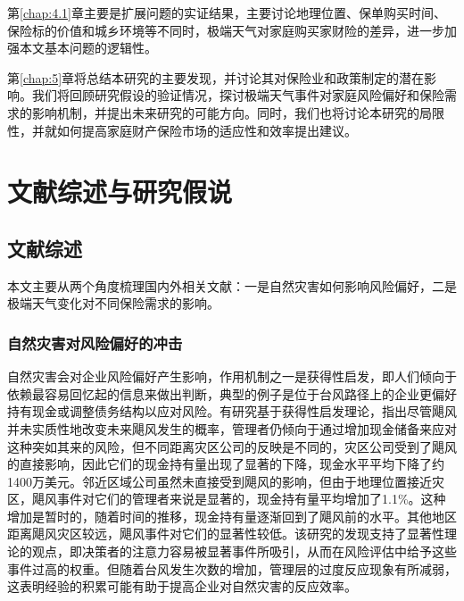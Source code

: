 第\ref{chap:4.1}章主要是扩展问题的实证结果，主要讨论地理位置、保单购买时间、保险标的价值和城乡环境等不同时，极端天气对家庭购买家财险的差异，进一步加强本文基本问题的逻辑性。

第\ref{chap:5}章将总结本研究的主要发现，并讨论其对保险业和政策制定的潜在影响。我们将回顾研究假设的验证情况，探讨极端天气事件对家庭风险偏好和保险需求的影响机制，并提出未来研究的可能方向。同时，我们也将讨论本研究的局限性，并就如何提高家庭财产保险市场的适应性和效率提出建议。

\chapter{文献综述与研究假说}\label{chap:2}
\section{文献综述}

本文主要从两个角度梳理国内外相关文献：一是自然灾害如何影响风险偏好，二是极端天气变化对不同保险需求的影响。

\subsection{自然灾害对风险偏好的冲击}

自然灾害会对企业风险偏好产生影响，作用机制之一是获得性启发\citep{tversky1973availability}，即人们倾向于依赖最容易回忆起的信息来做出判断，典型的例子是位于台风路径上的企业更偏好持有现金\citep{杨娜娜2019自然灾害与企业现金持有}或调整债务结构\citep{shao2024typhoons}以应对风险。有研究基于获得性启发理论\citep{0Do}，指出尽管飓风并未实质性地改变未来飓风发生的概率，管理者仍倾向于通过增加现金储备来应对这种突如其来的风险，但不同距离灾区公司的反映是不同的，灾区公司受到了飓风的直接影响，因此它们的现金持有量出现了显著的下降，现金水平平均下降了约1400万美元。邻近区域公司虽然未直接受到飓风的影响，但由于地理位置接近灾区，飓风事件对它们的管理者来说是显著的，现金持有量平均增加了1.1\%。这种增加是暂时的，随着时间的推移，现金持有量逐渐回到了飓风前的水平。其他地区距离飓风灾区较远，飓风事件对它们的显著性较低。该研究的发现支持了显著性理论的观点，即决策者的注意力容易被显著事件所吸引，从而在风险评估中给予这些事件过高的权重。但随着台风发生次数的增加，管理层的过度反应现象有所减弱，这表明经验的积累可能有助于提高企业对自然灾害的反应效率。

